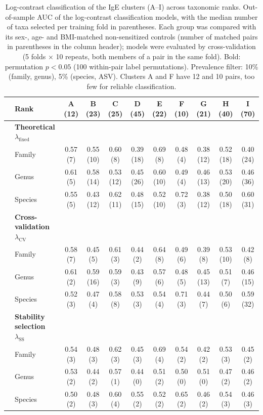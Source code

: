 \begin{table}
\small
\centering
\begin{tabular}{l l c c c c c c c c c }
 & \textbf{Rank} & \textbf{A} (12) & \textbf{B} (23) & \textbf{C} (25) & \textbf{D} (45) & \textbf{E} (22) & \textbf{F} (10) & \textbf{G} (21) & \textbf{H} (40) & \textbf{I} (70) \\
\hline
 & \textbf{Theoretical $\lambda_{\text{fixed}}$} & & & & & & & & & \\
& Family & 0.57 (7) & 0.55 (10) & 0.60 (8) & 0.39 (18) & 0.69 (8) & 0.48 (4) & 0.38 (12) & 0.52 (18) & 0.40 (24) \\
& Genus & 0.61 (5) & 0.58 (14) & 0.53 (12) & 0.45 (26) & 0.60 (10) & 0.49 (4) & 0.46 (13) & 0.53 (20) & 0.46 (36) \\
& Species & 0.55 (5) & 0.43 (12) & 0.62 (11) & 0.48 (15) & 0.52 (10) & 0.72 (3) & 0.38 (12) & 0.50 (18) & 0.60 (31) \\
\hline
 & \textbf{Cross-validation $\lambda_{\text{CV}}$} & & & & & & & & & \\
& Family & 0.58 (7) & 0.45 (5) & 0.61 (3) & 0.44 (2) & 0.64 (8) & 0.49 (6) & 0.39 (8) & 0.53 (10) & 0.42 (8) \\
& Genus & 0.61 (2) & 0.59 (16) & 0.59 (3) & 0.43 (9) & 0.57 (6) & 0.48 (5) & 0.45 (13) & 0.51 (7) & 0.46 (15) \\
& Species & 0.52 (3) & 0.47 (4) & 0.58 (8) & 0.53 (3) & 0.54 (4) & 0.71 (3) & 0.44 (7) & 0.50 (6) & 0.59 (32) \\
\hline
 & \textbf{Stability selection $\lambda_{\text{SS}}$} & & & & & & & & & \\
& Family & 0.54 (3) & 0.48 (3) & 0.62 (3) & 0.45 (3) & 0.69 (4) & 0.54 (2) & 0.42 (2) & 0.53 (3) & 0.45 (2) \\
& Genus & 0.53 (2) & 0.44 (2) & 0.57 (1) & 0.44 (0) & 0.51 (2) & 0.50 (0) & 0.51 (0) & 0.47 (2) & 0.46 (2) \\
& Species & 0.50 (2) & 0.48 (3) & 0.60 (4) & 0.55 (2) & 0.52 (2) & 0.65 (2) & 0.46 (2) & 0.54 (3) & 0.46 (3) \\
\hline
\end{tabular}
\caption{Log-contrast classification of the IgE clusters (A--I) across taxonomic ranks. Out-of-sample AUC of the log-contrast classification models, with the median number of taxa selected per training fold in parentheses. Each group was compared with its sex-, age- and BMI-matched non-sensitized controls (number of matched pairs in parentheses in the column header); models were evaluated by cross-validation (5 folds $\times$ 10 repeats, both members of a pair in the same fold). Bold: permutation $p<0.05$ (100 within-pair label permutations). Prevalence filter: 10\% (family, genus), 5\% (species, ASV). Clusters A and F have 12 and 10 pairs, too few for reliable classification.\label{tab:classo_auc_clusters}}
\end{table}

